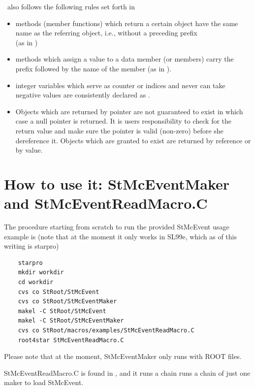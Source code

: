 \StMcEvent\ also follows the following rules set forth in \StEvent\ 
\begin{itemize}
\item methods (member functions) which return a certain object have
    the same name as the referring object, i.e., without a preceding
    \name{get} prefix \\ (as in \name{StMcEvent::primary\-Vertex()})
\item methods which assign a value to a data member (or members) carry
    the prefix \name{set} followed by the name of the member (as in ).
\item integer variables which serve as counter or indices and never
    can take negative values are consistently declared as
    .
\item Objects which are returned by pointer are not guaranteed to
    exist in which case a null pointer is returned. It is users
    responsibility to check for the return value and make sure the
    pointer is valid (non-zero) before she dereference it.  Objects
    which are granted to exist are returned by reference or by value.
\end{itemize}


\section{How to use it: StMcEventMaker and StMcEventReadMacro.C}
\label{sec:howto}
The procedure starting from scratch to run the provided StMcEvent usage
example is (note that at the moment it only works in SL99e, which as of this
writing is starpro)
\begin{verbatim}
    starpro
    mkdir workdir
    cd workdir
    cvs co StRoot/StMcEvent
    cvs co StRoot/StMcEventMaker
    makel -C StRoot/StMcEvent
    makel -C StRoot/StMcEventMaker
    cvs co StRoot/macros/examples/StMcEventReadMacro.C
    root4star StMcEventReadMacro.C
\end{verbatim}

Please note that at the moment, StMcEventMaker only runs with ROOT files.

StMcEventReadMacro.C is found in
,  %
and it runs a chain runs a
chain of just one maker to load StMcEvent.


